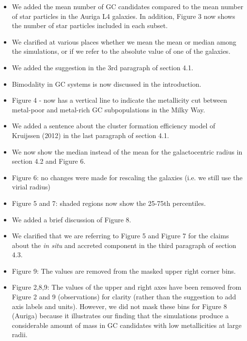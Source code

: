 \documentclass{article}
\begin{document}
\begin{itemize}
\item We added the mean number of GC candidates compared to the mean number of
star particles in the Auriga L4 galaxies. In addition, Figure 3 now shows the 
number of star particles included in each subset.
\item We clarified at various places whether we mean the mean or median among
the simulations, or if we refer to the absolute value of one of the galaxies.
\item We added the suggestion in the 3rd paragraph of section 4.1.
\item Bimodality in GC systems is now discussed in the introduction.
\item Figure 4 - now has a vertical line to indicate the metallicity cut 
between metal-poor and metal-rich GC subpopulations in the Milky Way.
\item We added a sentence about the cluster formation efficiency model of 
Kruijssen (2012) in the last paragraph of section 4.1.
\item We now show the median instead of the mean for the galactocentric radius in
section 4.2 and Figure 6.
\item Figure 6: no changes were made for rescaling the galaxies (i.e. we still
use the virial radius)
\item Figure 5 and 7: shaded regions now show the 25-75th percentiles.
\item We added a brief discussion of Figure 8.
\item We clarified that we are referring to Figure 5 and Figure 7 for the claims about
the {\it in situ} and accreted component in the third paragraph of section 4.3.
\item Figure 9: The values are removed from the masked upper right corner bins.
\item Figure 2,8,9: The values of the upper and right axes have been removed from
Figure 2 and 9 (observations) for clarity (rather than the suggestion to add 
axis labels and units). However, we did not mask these bins for Figure 8 (Auriga)
because it illustrates our finding that the simulations produce a considerable
amount of mass in GC candidates with low metallicities at large radii.
\end{itemize}
\end{document}
